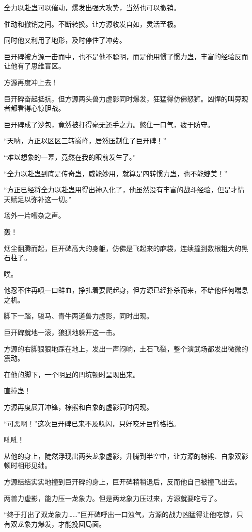 \begin{this_body}
全力以赴蛊可以催动，爆发出强大攻势，当然也可以撤销。

催动和撤销之间。不断转换。让方源收发自如，灵活至极。

同时他又利用了地形，及时停住了冲势。

巨开碑被方源一击而中，也不是他不聪明，而是他用惯了惯力蛊，丰富的经验反而让他有了思维盲区。

方源再度冲上去！

巨开碑奋起抵抗，但方源两头兽力虚影同时爆发，狂猛得仿佛怒狮。凶悍的叫旁观者都看得心惊胆战。

巨开碑成了沙包，竟然被打得毫无还手之力。憋住一口气，疲于防守。

“天呐，方正以区区三转巅峰，居然压制住了巨开碑！”

“难以想象的一幕，竟然在我的眼前发生了。”

“全力以赴蛊到底是传奇蛊，威能妙用，就算是四转惯力蛊，也不能媲美！”

“方正已经将全力以赴蛊用得出神入化了，他虽然没有丰富的战斗经验，但是才情天赋足以弥补这一切。”

场外一片嘈杂之声。

轰！

烟尘翻腾而起，巨开碑高大的身躯，仿佛是飞起来的麻袋，连续撞到数根粗大的黑石柱子。

噗。

他忍不住再喷一口鲜血，挣扎着要爬起身，但方源已经扑杀而来，不给他任何喘息之机。

脚下一踏，骏马、青牛两道兽力虚影，同时出现。

巨开碑就地一滚，狼狈地躲开这一击。

方源的右脚狠狠地踩在地上，发出一声闷响，土石飞裂，整个演武场都发出微微的震动。

在他的脚下，一个明显的凹坑顿时呈现出来。

直撞蛊！

方源再度展开冲锋，棕熊和白象的虚影同时闪现。

“可恶啊！”这次巨开碑已来不及躲闪，只好咬牙巨臂格挡。

吼吼！

从他的身上，陡然浮现出两头龙象虚影，升腾到半空中，让方源的棕熊、白象双影顿时相形见绌。

方源结结实实地撞到巨开碑的身上，巨开碑稍稍退后，反而他自己被撞飞出去。

两兽力虚影，能力压一龙象力。但是两龙象力压过来，方源就要吃亏了。

“终于打出了双龙象力……”巨开碑呼出一口浊气，方源的战力凶猛得让他吃惊，只有双龙象力爆发，才能挽回局面。


\end{this_body}
